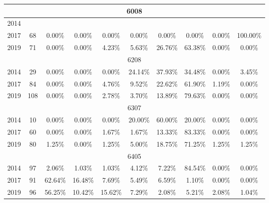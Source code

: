 \begin{table}[H]
\begin{tabular}{|l|c|ccc|ccc|cc|}
\hline
\hline
\multicolumn{10}{|c|}{6008}\\
\hline
2014 & & & & & & & & & \\
2017 & 68 & 0.00\% & 0.00\% & 0.00\% & 0.00\% & 0.00\% & 0.00\% & 0.00\% & 100.00\%\\
2019 & 71 & 0.00\% & 0.00\% & 4.23\% & 5.63\% & 26.76\% & 63.38\% & 0.00\% & 0.00\%\\
\hline
\hline
\multicolumn{10}{|c|}{6208}\\
\hline
2014 & 29 & 0.00\% & 0.00\% & 0.00\% & 24.14\% & 37.93\% & 34.48\% & 0.00\% & 3.45\%\\
2017 & 84 & 0.00\% & 0.00\% & 4.76\% & 9.52\% & 22.62\% & 61.90\% & 1.19\% & 0.00\%\\
2019 & 108 & 0.00\% & 0.00\% & 2.78\% & 3.70\% & 13.89\% & 79.63\% & 0.00\% & 0.00\%\\
\hline
\hline
\multicolumn{10}{|c|}{6307}\\
\hline
2014 & 10 & 0.00\% & 0.00\% & 0.00\% & 20.00\% & 60.00\% & 20.00\% & 0.00\% & 0.00\%\\
2017 & 60 & 0.00\% & 0.00\% & 1.67\% & 1.67\% & 13.33\% & 83.33\% & 0.00\% & 0.00\%\\
2019 & 80 & 1.25\% & 0.00\% & 1.25\% & 5.00\% & 18.75\% & 71.25\% & 1.25\% & 1.25\%\\
\hline
\hline
\multicolumn{10}{|c|}{6405}\\
\hline
2014 & 97 & 2.06\% & 1.03\% & 1.03\% & 4.12\% & 7.22\% & 84.54\% & 0.00\% & 0.00\%\\
2017 & 91 & 62.64\% & 16.48\% & 7.69\% & 5.49\% & 6.59\% & 1.10\% & 0.00\% & 0.00\%\\
2019 & 96 & 56.25\% & 10.42\% & 15.62\% & 7.29\% & 2.08\% & 5.21\% & 2.08\% & 1.04\%\\
\hline
\bottomrule
\end{tabular}
\end{table}
